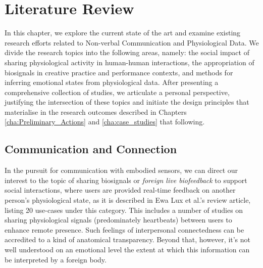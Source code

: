 

\chapter{Literature Review}
\label{cha:lit_review}

In this chapter, we explore the current state of the art and examine existing research efforts related to Non-verbal Communication and Physiological Data. We divide the research topics into the following areas, namely: the social impact of sharing physiological activity in human-human interactions, the appropriation of biosignals in creative practice and performance contexts, and methods for inferring emotional states from physiological data. After presenting a comprehensive collection of studies, we articulate a personal perspective, justifying the intersection of these topics and initiate the design principles that materialise in the research outcomes described in Chapters \ref{cha:Preliminary_Actions} and \ref{cha:case_studies} that following.



\section{Communication and Connection}
\label{lit_review:biosignals_sharing}


In the pursuit for communication with embodied sensors, we can direct our interest to the topic of sharing biosignals or \textit{foreign live biofeedback} to support social interactions, where users are provided real-time feedback on another person's physiological state, as it is described in Ewa Lux et al.'s \cite{lux_live_2018} review article, listing 20 use-cases under this category. This includes a number of studies on sharing physiological signals (predominately heartbeats) between users to enhance remote presence. Such feelings of interpersonal connectedness can be accredited to a kind of anatomical transparency. Beyond that, however, it's not well understood on an emotional level the extent at which this information can be interpreted by a foreign body.

